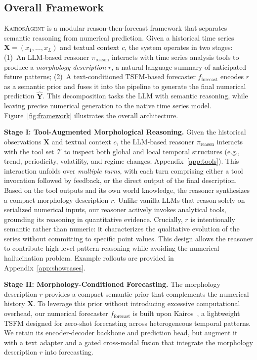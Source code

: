 \documentclass[11pt]{article}
\newcommand{\method}{\textsc{KairosAgent}\xspace}
\newcommand{\minisection}[1]{\vspace{5pt}\noindent\textbf{#1.}}
\begin{document}
\subsection{Overall Framework}
\method is a modular reason-then-forecast framework that separates semantic reasoning from numerical prediction.
Given a historical time series $\mathbf{X}=(x_1,\ldots,x_L)$ and textual context $c$, the system operates in two stages:
(1)~An LLM-based reasoner $\pi_{\mathrm{reason}}$  interacts with time series analysis tools to produce a \emph{morphology description} $r$, a natural-language summary of anticipated future patterns;
(2)~A text-conditioned TSFM-based forecaster $f_{\mathrm{forecast}}$  encodes $r$ as a semantic prior and fuses it into the pipeline to generate the final numerical prediction $\hat{\mathbf{Y}}$.
This decomposition tasks the LLM with semantic reasoning, while leaving precise numerical generation to the native time series model. 
Figure~\ref{fig:framework} illustrates the overall architecture.

\minisection{Stage I: Tool-Augmented Morphological Reasoning}
Given the historical observations $\mathbf{X}$ and textual context $c$, the LLM-based reasoner $\pi_{\mathrm{reason}}$ interacts with the tool set $\mathcal{T}$ to inspect both global and local temporal structures (e.g., trend, periodicity, volatility, and regime changes; Appendix~\ref{app:tools}).
This interaction unfolds over \textit{multiple turns}, with each turn comprising either a tool invocation followed by feedback, or the direct output of the final description.
Based on the tool outputs and its own world knowledge, the reasoner synthesizes a compact morphology description $r$.
Unlike vanilla LLMs that reason solely on serialized numerical inputs, our reasoner actively invokes analytical tools, grounding its reasoning in quantitative evidence.
Crucially, $r$ is intentionally semantic rather than numeric: it characterizes the qualitative evolution of the series without committing to specific point values.
This design allows the reasoner to contribute high-level pattern reasoning while avoiding the numerical hallucination problem.
Example rollouts are provided in Appendix~\ref{app:showcases}.

\minisection{Stage II: Morphology-Conditioned Forecasting}
The morphology description $r$ provides a compact semantic prior that complements the numerical history $\mathbf{X}$.
To leverage this prior without introducing excessive computational overhead, our numerical forecaster $f_{\mathrm{forecast}}$ is built upon Kairos~\citep{feng2025kairos}, a lightweight TSFM designed for zero-shot forecasting across heterogeneous temporal patterns. 
We retain its encoder-decoder backbone and prediction head, but augment it with a text adapter and a gated cross-modal fusion that integrate the morphology description $r$ into forecasting.
\end{document}
